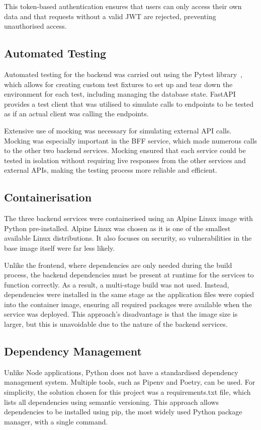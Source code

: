This token-based authentication ensures that users can only access their own data and that requests without a valid JWT are rejected, preventing unauthorised access.

\subsection{Automated Testing}
Automated testing for the backend was carried out using the Pytest library~\cite{PyTest}, which allows for creating custom test fixtures to set up and tear down the environment for each test, including managing the database state. FastAPI provides a test client that was utilised to simulate calls to endpoints to be tested as if an actual client was calling the endpoints.

Extensive use of mocking was necessary for simulating external API calls. Mocking was especially important in the BFF service, which made numerous calls to the other two backend services. Mocking ensured that each service could be tested in isolation without requiring live responses from the other services and external APIs, making the testing process more reliable and efficient.

\subsection{Containerisation}
The three backend services were containerised using an Alpine Linux image with Python pre-installed. Alpine Linux was chosen as it is one of the smallest available Linux distributions. It also focuses on security, so vulnerabilities in the base image itself were far less likely.

Unlike the frontend, where dependencies are only needed during the build process, the backend dependencies must be present at runtime for the services to function correctly. As a result, a multi-stage build was not used. Instead, dependencies were installed in the same stage as the application files were copied into the container image, ensuring all required packages were available when the service was deployed. This approach's disadvantage is that the image size is larger, but this is unavoidable due to the nature of the backend services.

\subsection{Dependency Management}
Unlike Node applications, Python does not have a standardised dependency management system. Multiple tools, such as Pipenv and Poetry, can be used. For simplicity, the solution chosen for this project was a requirements.txt file, which lists all dependencies using semantic versioning. This approach allows dependencies to be installed using pip, the most widely used Python package manager, with a single command.

